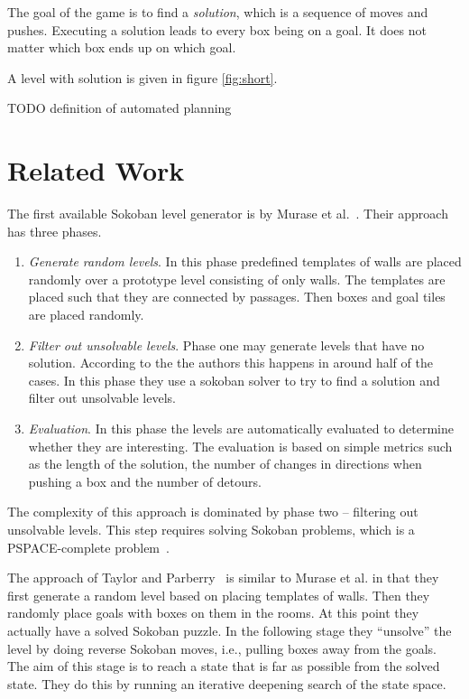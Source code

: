 \documentclass[runningheads]{llncs}
\begin{document}
The goal of the game is to find a \emph{solution}, which
is a sequence of moves and pushes. Executing a solution leads to every box
being on a goal. It does not matter which box ends up on which goal.


A level with solution is given in figure \ref{fig:short}.



TODO definition of automated planning

\section{Related Work}
The first available Sokoban level generator is by Murase et al.~\cite{murase1996automatic}.
Their approach has three phases.
\begin{enumerate}
\item \emph{Generate random levels}. In this phase predefined templates of walls are placed randomly
over a prototype level consisting of only walls. 
The templates are placed such that they are connected by passages.
Then boxes and goal tiles are placed randomly.
\item \emph{Filter out unsolvable levels}. Phase one may generate levels that have no solution. According to the the authors this happens in around half of the cases. In this phase they use a sokoban solver to try to find a solution and filter out unsolvable levels.
\item \emph{Evaluation}. In this phase the levels are automatically evaluated to determine whether
they are interesting. The evaluation is based on simple metrics such as the length of the solution, the number of changes in directions when pushing a box and the number of detours.
\end{enumerate}

The complexity of this approach is dominated by phase two -- filtering out unsolvable levels. This
step requires solving Sokoban problems, which is a PSPACE-complete problem~\cite{culberson1997sokoban}.

The approach of Taylor and Parberry~\cite{taylor2011procedural} is similar to Murase et al.
in that they first generate a random level based on placing templates of walls. Then they
randomly place goals with boxes on them in the rooms. At this point they 
actually have a solved Sokoban
puzzle. In the following stage they ``unsolve'' the level by doing reverse Sokoban moves, i.e., 
pulling boxes away from the goals. The aim of this stage is to reach a state that is far as 
possible from the solved state. They do this by running an iterative deepening search of the
state space.
\end{document}
